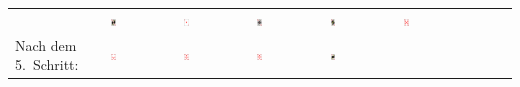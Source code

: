 \begin{tabular}{m{30mm}m{11mm}m{11mm}m{11mm}m{11mm}m{11mm}m{11mm}m{11mm}m{11mm}}
&
\includegraphics[width=0.08\textwidth]{./inf/SEKII/19_Java_Sortierverfahren/HerzBube.png}
&
\includegraphics[width=0.08\textwidth]{./inf/SEKII/19_Java_Sortierverfahren/HerzAs.png}
&
\includegraphics[width=0.08\textwidth]{./inf/SEKII/19_Java_Sortierverfahren/HerzKoenig.png}
&
\includegraphics[width=0.08\textwidth]{./inf/SEKII/19_Java_Sortierverfahren/HerzDame.png}
&
\includegraphics[width=0.08\textwidth]{./inf/SEKII/19_Java_Sortierverfahren/Herz9.png}
\\
Nach dem 5.\ Schritt: &
\includegraphics[width=0.08\textwidth]{./inf/SEKII/19_Java_Sortierverfahren/Herz7.png}
&
\includegraphics[width=0.08\textwidth]{./inf/SEKII/19_Java_Sortierverfahren/Herz8.png}
&
\includegraphics[width=0.08\textwidth]{./inf/SEKII/19_Java_Sortierverfahren/Herz10.png}
&
\includegraphics[width=0.08\textwidth]{./inf/SEKII/19_Java_Sortierverfahren/HerzBube.png}

\end{tabular}
